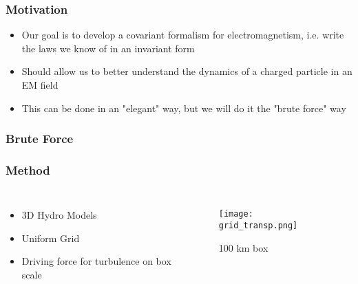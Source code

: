 \documentclass{beamer}
\begin{document}


\begin{frame}

        \frametitle{Motivation}
	\begin{itemize}
		\item Our goal is to develop a covariant formalism for electromagnetism, i.e. write the laws we know of in an invariant form
		\item Should allow us to better understand the dynamics of a charged particle in an EM field
		\item This can be done in an "elegant" way, but we will do it the "brute force" way
	\end{itemize}
\end{frame}




\begin{frame}
\frametitle{Brute Force}


\end{frame}






\begin{frame}
\frametitle{Method}

\begin{columns}[c]
        \begin{itemize}
                \item 3D Hydro Models
                \item Uniform Grid
                \item Driving force for turbulence on box scale
        \end{itemize}


        \vspace{25pt}
        \begin{figure}
    \begin{center}
      \texttt{[image: grid\_transp.png]}
	    \caption{100 km box}
    \end{center}
  \end{figure}

        \end{columns}

\end{frame}
\end{document}
